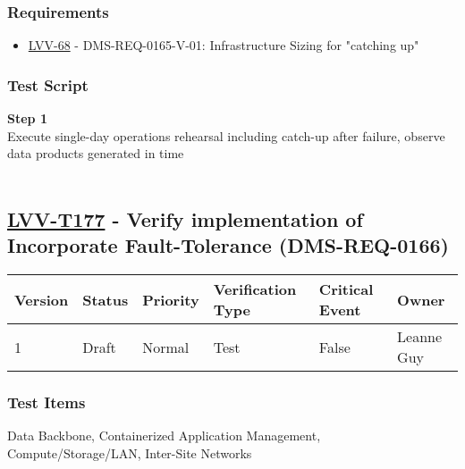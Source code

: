 \hypertarget{requirements-153}{%
\subsubsection{Requirements}\label{requirements-153}}

\begin{itemize}
\tightlist
\item
  \href{https://jira.lsstcorp.org/browse/LVV-68}{LVV-68} -
  DMS-REQ-0165-V-01: Infrastructure Sizing for "catching up"
\end{itemize}

\hypertarget{test-script-153}{%
\subsubsection{Test Script}\label{test-script-153}}

\textbf{Step 1}\\
Execute single-day operations rehearsal including catch-up after
failure, observe data products generated in time\\
~\\

\hypertarget{lvv-t177---verify-implementation-of-incorporate-fault-tolerance-dms-req-0166}{%
\subsection{\texorpdfstring{\href{https://jira.lsstcorp.org/secure/Tests.jspa\#/testCase/LVV-T177}{LVV-T177}
- Verify implementation of Incorporate Fault-Tolerance
(DMS-REQ-0166)}{LVV-T177 - Verify implementation of Incorporate Fault-Tolerance (DMS-REQ-0166)}}\label{lvv-t177---verify-implementation-of-incorporate-fault-tolerance-dms-req-0166}}

\begin{longtable}[]{@{}llllll@{}}
\toprule
Version & Status & Priority & Verification Type & Critical Event &
Owner\tabularnewline
\midrule
\endhead
1 & Draft & Normal & Test & False & Leanne Guy\tabularnewline
\bottomrule
\end{longtable}

\hypertarget{test-items-153}{%
\subsubsection{Test Items}\label{test-items-153}}

Data Backbone, Containerized Application Management,
Compute/Storage/LAN, Inter-Site Networks~

